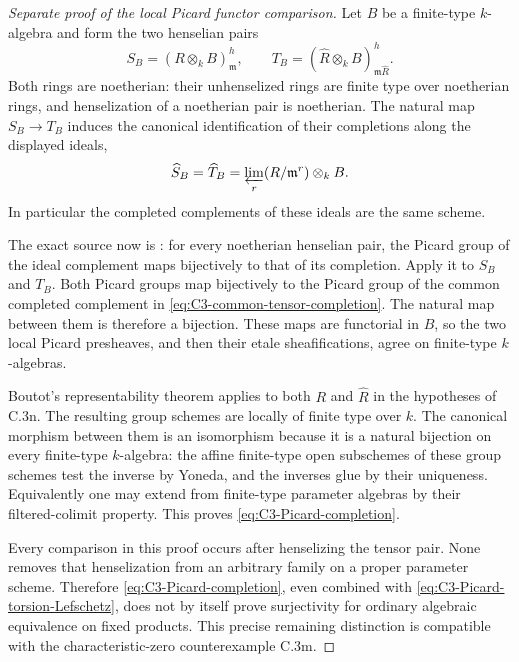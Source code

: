 \begin{proof}[Separate proof of the local Picard functor comparison]
Let $B$ be a finite-type $k$-algebra and form the
two henselian pairs
\[
 S_B=(R\otimes_k B)^h_{\mathfrak m},\qquad
 T_B=(\widehat R\otimes_k B)^h_{\mathfrak m\widehat R}.
\]
Both rings are noetherian: their unhenselized
rings are finite type over noetherian rings,
and henselization of a noetherian pair is
noetherian. The natural map $S_B\to T_B$
induces the canonical identification of their
completions along the displayed ideals,
\begin{equation}\label{eq:C3-common-tensor-completion}
 \widehat S_B=\widehat T_B
       =\varprojlim_r (R/\mathfrak m^r)\otimes_k B.
\end{equation}
In particular the completed complements of
these ideals are the same scheme.

The exact source now is
\citet[Section III, Theorem 3, p.~569, and its
unnumbered Picard corollary on p.~573]{D_Elkik1973}:
for every noetherian henselian pair, the Picard
group of the ideal complement maps bijectively
to that of its completion. Apply it to $S_B$
and $T_B$. Both Picard groups map bijectively
to the Picard group of the common completed
complement in \eqref{eq:C3-common-tensor-completion}.
The natural map between them is therefore
a bijection. These maps are functorial in $B$,
so the two local Picard presheaves, and then
their etale sheafifications, agree on finite-type
$k$-algebras.

Boutot's representability theorem applies to
both $R$ and $\widehat R$ in the hypotheses
of C.3n. The resulting group schemes are
locally of finite type over $k$. The canonical
morphism between them is an isomorphism
because it is a natural bijection on every
finite-type $k$-algebra: the affine finite-type
open subschemes of these group schemes test
the inverse by Yoneda, and the inverses glue
by their uniqueness. Equivalently one may
extend from finite-type parameter algebras
by their filtered-colimit property.
This proves \eqref{eq:C3-Picard-completion}.

Every comparison in this proof occurs after
henselizing the tensor pair. None removes
that henselization from an arbitrary family
on a proper parameter scheme. Therefore
\eqref{eq:C3-Picard-completion}, even combined
with \eqref{eq:C3-Picard-torsion-Lefschetz},
does not by itself prove surjectivity for
ordinary algebraic equivalence on fixed
products. This precise remaining distinction
is compatible with the characteristic-zero
counterexample C.3m.
\end{proof}
